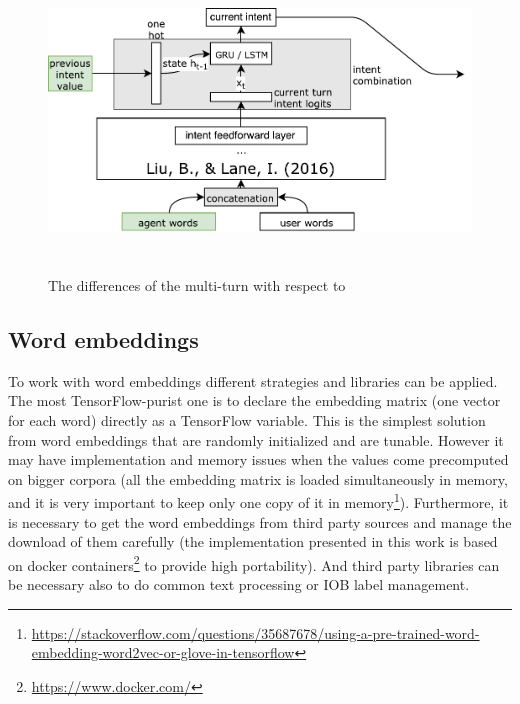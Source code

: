 
\begin{figure}[!htbp]
    \centering
    \includegraphics[max width=\linewidth,max height=8cm,keepaspectratio]{figures/approachMultiTurnDifferences}
    \caption{The differences of the multi-turn with respect to~\cite{liu2016attention}}\label{fig:approachMultiTurnDifferences}
\end{figure}

\subsection{Word embeddings}
\label{implementationWV}

To work with word embeddings different strategies and libraries can be applied. The most TensorFlow-purist one is to declare the embedding matrix (one vector for each word) directly as a TensorFlow variable. This is the simplest solution from word embeddings that are randomly initialized and are tunable. However it may have implementation and memory issues when the values come precomputed on bigger corpora (all the embedding matrix is loaded simultaneously in memory, and it is very important to keep only one copy of it in memory\footnote{\url{https://stackoverflow.com/questions/35687678/using-a-pre-trained-word-embedding-word2vec-or-glove-in-tensorflow}}). Furthermore, it is necessary to get the word embeddings from third party sources and manage the download of them carefully (the implementation presented in this work is based on docker containers\footnote{\url{https://www.docker.com/}} to provide high portability). And third party libraries can be necessary also to do common text processing or IOB label management.

